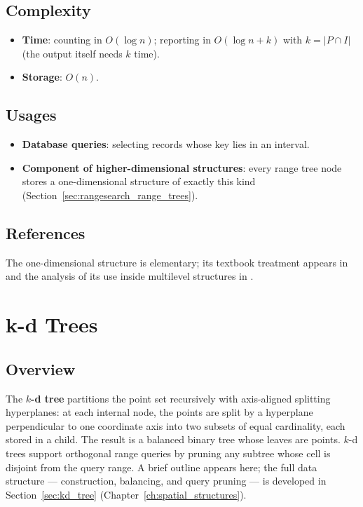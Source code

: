 \subsection{Complexity}

\begin{itemize}
  \item \textbf{Time}: counting in $O(\log n)$; reporting in
    $O(\log n + k)$ with $k = |P \cap I|$ (the output itself needs $k$ time).
  \item \textbf{Storage}: $O(n)$.
\end{itemize}

\subsection{Usages}

\begin{itemize}
  \item \textbf{Database queries}: selecting records whose key lies in an
    interval.
  \item \textbf{Component of higher-dimensional structures}: every range
    tree node stores a one-dimensional structure of exactly this kind
    (Section~\ref{sec:rangesearch_range_trees}).
\end{itemize}

\subsection{References}

The one-dimensional structure is elementary; its textbook treatment
appears in \cite{berg2008} and the analysis of its use inside multilevel
structures in \cite{bentley1980multidim}.

\section{k-d Trees}
\label{sec:rangesearch_kd_trees}

\subsection{Overview}

The \textbf{$k$-d tree} partitions the point set
recursively with axis-aligned splitting hyperplanes: at each internal node,
the points are split by a hyperplane perpendicular to one coordinate axis
into two subsets of equal cardinality, each stored in a child. The result
is a balanced binary tree whose leaves are points. $k$-d trees support
orthogonal range queries by pruning any subtree whose cell is disjoint from
the query range. A brief outline appears here; the full data structure ---
construction, balancing, and query pruning --- is developed in
Section~\ref{sec:kd_tree} (Chapter~\ref{ch:spatial_structures}).

